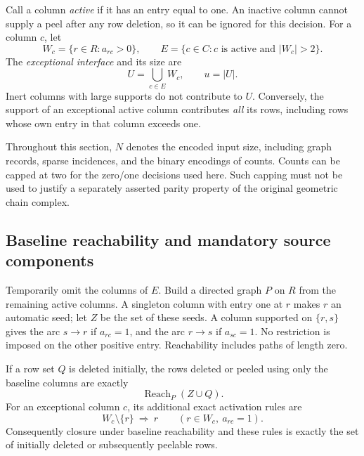 Call a column \emph{active} if it has an entry equal to one.  An inactive
column cannot supply a peel after any row deletion, so it can be ignored
for this decision.  For a column $c$, let
\[
         W_c=\{r\in R:a_{rc}>0\},\qquad
         E=\{c\in C:c\text{ is active and }|W_c|>2\}.
\]
The \emph{exceptional interface} and its size are
\begin{equation}
          U=\bigcup_{c\in E}W_c,\qquad u=|U|.
          \label{eq:exceptional-interface}
\end{equation}
Inert columns with large supports do not contribute to $U$.  Conversely,
the support of an exceptional active column contributes \emph{all} its
rows, including rows whose own entry in that column exceeds one.

Throughout this section, $N$ denotes the encoded input size, including
graph records, sparse incidences, and the binary encodings of counts.
Counts can be capped at two for the zero/one decisions used here.  Such
capping must not be used to justify a separately asserted parity property
of the original geometric chain complex.

\subsection{Baseline reachability and mandatory source components}
\label{subsec:exceptional-baseline}

Temporarily omit the columns of $E$.  Build a directed graph $P$ on $R$
from the remaining active columns.  A singleton column with entry one at
$r$ makes $r$ an automatic seed; let $Z$ be the set of these seeds.  A
column supported on $\{r,s\}$ gives the arc $s\to r$ if $a_{rc}=1$, and
the arc $r\to s$ if $a_{sc}=1$.  No restriction is imposed on the other
positive entry.  Reachability includes paths of length zero.

\begin{lemma}
\label{lem:exceptional-baseline}
If a row set $Q$ is deleted initially, the rows deleted or peeled using
only the baseline columns are exactly
\[
                         \operatorname{Reach}_P(Z\cup Q).
\]
For an exceptional column $c$, its additional exact activation rules are
\begin{equation}
             W_c\setminus\{r\}\ \Longrightarrow\ r
             \qquad(r\in W_c,\ a_{rc}=1).
             \label{eq:exceptional-horn-rules}
\end{equation}
Consequently closure under baseline reachability and these rules is
exactly the set of initially deleted or subsequently peelable rows.
\end{lemma}

